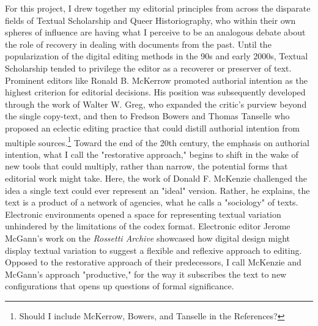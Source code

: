\documentclass[11pt]{article}
\begin{document}
For this project, I drew together my editorial principles from across
the disparate fields of Textual Scholarship and Queer Historiography,
who within their own spheres of influence are having what I perceive
to be an analogous debate about the role of recovery in dealing with
documents from the past. Until the popularization of the digital
editing methods in the 90s and early 2000s, Textual Scholarship tended
to privilege the editor as a recoverer or preserver of text. Prominent
editors like Ronald B. McKerrow promoted authorial intention as the
highest criterion for editorial decisions. His position was
subsequently developed through the work of Walter W. Greg, who
expanded the critic's purview beyond the single copy-text, and then to
Fredson Bowers and Thomas Tanselle who proposed an eclectic editing
practice that could distill authorial intention from multiple
sources.\footnote{Should I include McKerrow, Bowers, and Tanselle in the References?} Toward the end of the 20th century, the emphasis on
authorial intention, what I call the "restorative approach," begins to
shift in the wake of new tools that could multiply, rather than
narrow, the potential forms that editorial work might take. Here, the
work of Donald F. McKenzie challenged the idea a single text could
ever represent an "ideal" version. Rather, he explains, the text is a
product of a network of agencies, what he calls a "sociology" of
texts. Electronic environments opened a space for representing textual
variation unhindered by the limitations of the codex
format. Electronic editor Jerome McGann's work on the \emph{Rossetti
Archive} showcased how digital design might display textual variation
to suggest a flexible and reflexive approach to editing. Opposed to
the restorative approach of their predecessors, I call McKenzie and
McGann's approach "productive," for the way it subscribes the text to
new configurations that opens up questions of formal significance. 
\end{document}

